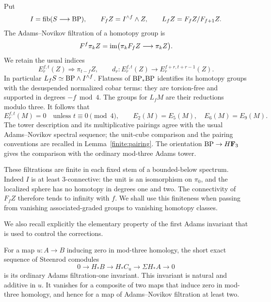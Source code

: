 Put
\[
 I=\operatorname{fib}(S\longrightarrow\mathrm{BP}),\qquad
 F_fZ=I^{\wedge f}\wedge Z,\qquad
 L_fZ=F_fZ/F_{f+1}Z.
\]
The Adams--Novikov filtration of a homotopy group is
\[
 F^f\pi_kZ=\operatorname{im}\bigl(\pi_kF_fZ\longrightarrow\pi_kZ\bigr).
\]
We retain the usual indices
\[
 E_r^{f,t}(Z)\Longrightarrow\pi_{t-f}Z,\qquad
 d_r:E_r^{f,t}(Z)\longrightarrow E_r^{f+r,t+r-1}(Z).
\]
In particular \(L_fS\simeq\mathrm{BP}\wedge I^{\wedge f}\).  Flatness of
\(\mathrm{BP}_*\mathrm{BP}\) identifies its homotopy groups with the desuspended
normalized cobar terms: they are torsion-free and supported in degrees
\(-f\bmod4\).  The groups for \(L_fM\) are their reductions modulo three.
It follows that
\begin{equation}\label{cube:sparseness}
 E_r^{f,t}(M)=0\quad\text{unless }t\equiv0\pmod4,
 \qquad E_2(M)=E_5(M),\quad E_6(M)=E_9(M).
\end{equation}
The tower description and its multiplicative pairings agree with the
usual Adams--Novikov spectral sequence; the unit-cube comparison and
the pairing conventions are recalled in Lemma~\ref{finite:pairing}.
The orientation \(\mathrm{BP}\to H\mathbf F_3\) gives the comparison with the ordinary
mod-three Adams tower.

These filtrations are finite in each fixed stem of a bounded-below
spectrum.  Indeed \(I\) is at least 3-connective: the unit is an
isomorphism on \(\pi_0\), and the localized sphere has no homotopy in
degrees one and two.  The connectivity of \(F_fZ\) therefore tends to
infinity with \(f\).  We shall use this finiteness when passing from
vanishing associated-graded groups to vanishing homotopy classes.

We also recall explicitly the elementary property of the first Adams
invariant that is used to control the corrections.

\begin{lemma}\label{cube:primary-invariant}
For a map \(u:A\to B\) inducing zero in mod-three homology, the short
exact sequence of Steenrod comodules
\[
 0\longrightarrow H_*B\longrightarrow H_*C_u
   \longrightarrow \Sigma H_*A\longrightarrow0
\]
is its ordinary Adams filtration-one invariant.  This invariant is
natural and additive in \(u\).  It vanishes for a composite of two maps
that induce zero in mod-three homology, and hence for a map of
Adams--Novikov filtration at least two.
\end{lemma}

